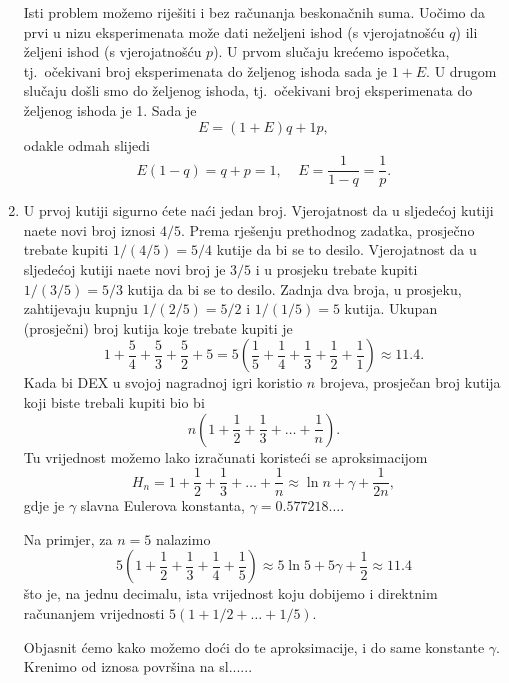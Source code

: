 \documentclass{ppclanak}
\begin{document}
\begin{enumerate}
Isti problem mo\v{z}emo rije\v{s}iti i bez ra\v{c}unanja
beskona\v{c}nih suma. Uo\v{c}imo da prvi u nizu eksperimenata
mo\v{z}e dati ne\v{z}eljeni ishod (s vjerojatno\v{s}\'{c}u $q$)
ili \v{z}eljeni ishod (s vjerojatno\v{s}\'{c}u $p$). U prvom
slu\v{c}aju kre\'{c}emo ispo\v{c}etka, tj.~o\v{c}ekivani broj
eksperimenata do \v{z}eljenog ishoda sada je $1+E$. U drugom
slu\v{c}aju do\v{s}li smo do \v{z}eljenog ishoda,
tj.~o\v{c}ekivani broj eksperimenata do \v{z}eljenog ishoda je 1.
Sada je
\[ E=(1+E)q +1p,\]
odakle odmah slijedi
\[ E(1-q)= q+ p =1, \;\;\;\; E=\frac{1}{1-q} = \frac{1}{p}.\]

\item U prvoj kutiji sigurno \'{c}ete na\'{c}i jedan broj.
Vjerojatnost da u sljede\'{c}oj kutiji na\dj ete novi broj iznosi
$4/5$. Prema rje\v{s}enju prethodnog zadatka, prosje\v{c}no
trebate kupiti $1/(4/5)=5/4$ kutije da bi se to desilo.
Vjerojatnost da u sljede\'{c}oj kutiji na\dj ete novi broj je
$3/5$ i u prosjeku trebate kupiti $1/(3/5)=5/3$ kutija da bi se to
desilo. Zadnja dva broja, u prosjeku, zahtijevaju kupnju
$1/(2/5)=5/2$ i $1/(1/5)=5$ kutija. Ukupan (prosje\v{c}ni) broj
kutija koje trebate kupiti je
\[ 1 + \frac{5}{4} + \frac{5}{3} + \frac{5}{2} + 5= 5\left(\frac{1}{5} + \frac{1}{4} + \frac{1}{3} +\frac{1}{2} + \frac{1}{1}\right)\approx 11.4 .\]
Kada bi DEX u svojoj nagradnoj igri koristio $n$ brojeva,
prosje\v{c}an broj kutija koji biste trebali kupiti bio bi
\[ n\left(1 + \frac{1}{2} +\frac{1}{3}+\ldots + \frac{1}{n}\right).\]
Tu vrijednost mo\v{z}emo lako izra\v{c}unati koriste\'{c}i se
aproksimacijom
\[ H_n= 1 +\frac{1}{2} +\frac{1}{3}+\ldots + \frac{1}{n} \approx \ln n + \gamma +\frac{1}{2n},\]
gdje je $\gamma$ slavna Eulerova konstanta,
$\gamma=0.577218\ldots$.

Na primjer, za $n=5$ nalazimo
\[ 5\left(1 + \frac{1}{2} +\frac{1}{3}+\frac{1}{4} + \frac{1}{5}\right)\approx 5\ln 5 +5\gamma +\frac{1}{2}\approx 11.4 \]
\v{s}to je, na jednu decimalu, ista vrijednost koju dobijemo i
direktnim ra\v{c}unanjem vrijednosti $5(1+1/2+\ldots +1/5)$.

Objasnit \'{c}emo kako mo\v{z}emo do\'{c}i do te aproksimacije, i
do same konstante $\gamma$. Krenimo od iznosa povr\v{s}ina na
sl......


\end{enumerate}
\end{document}
